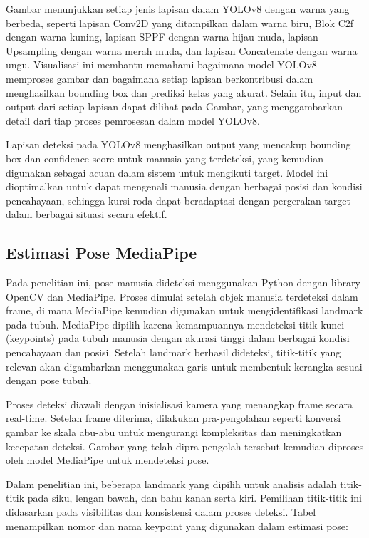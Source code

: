 Gambar menunjukkan setiap jenis lapisan dalam YOLOv8 dengan warna yang berbeda, seperti lapisan Conv2D yang ditampilkan dalam warna biru, Blok C2f dengan warna kuning, lapisan SPPF dengan warna hijau muda, lapisan Upsampling dengan warna merah muda, dan lapisan Concatenate dengan warna ungu. Visualisasi ini membantu memahami bagaimana model YOLOv8 memproses gambar dan bagaimana setiap lapisan berkontribusi dalam menghasilkan bounding box dan prediksi kelas yang akurat. Selain itu, input dan output dari setiap lapisan dapat dilihat pada Gambar, yang menggambarkan detail dari tiap proses pemrosesan dalam model YOLOv8.

Lapisan deteksi pada YOLOv8 menghasilkan output yang mencakup bounding box dan confidence score untuk manusia yang terdeteksi, yang kemudian digunakan sebagai acuan dalam sistem untuk mengikuti target. Model ini dioptimalkan untuk dapat mengenali manusia dengan berbagai posisi dan kondisi pencahayaan, sehingga kursi roda dapat beradaptasi dengan pergerakan target dalam berbagai situasi secara efektif.

\subsection{Estimasi Pose MediaPipe}
\label{subsec:estimasi_pose_mediapipe}

Pada penelitian ini, pose manusia dideteksi menggunakan Python dengan library OpenCV dan MediaPipe. Proses dimulai setelah objek manusia terdeteksi dalam frame, di mana MediaPipe kemudian digunakan untuk mengidentifikasi landmark pada tubuh. MediaPipe dipilih karena kemampuannya mendeteksi titik kunci (keypoints) pada tubuh manusia dengan akurasi tinggi dalam berbagai kondisi pencahayaan dan posisi. Setelah landmark berhasil dideteksi, titik-titik yang relevan akan digambarkan menggunakan garis untuk membentuk kerangka sesuai dengan pose tubuh.

Proses deteksi diawali dengan inisialisasi kamera yang menangkap frame secara real-time. Setelah frame diterima, dilakukan pra-pengolahan seperti konversi gambar ke skala abu-abu untuk mengurangi kompleksitas dan meningkatkan kecepatan deteksi. Gambar yang telah dipra-pengolah tersebut kemudian diproses oleh model MediaPipe untuk mendeteksi pose.

Dalam penelitian ini, beberapa landmark yang dipilih untuk analisis adalah titik-titik pada siku, lengan bawah, dan bahu kanan serta kiri. Pemilihan titik-titik ini didasarkan pada visibilitas dan konsistensi dalam proses deteksi. Tabel menampilkan nomor dan nama keypoint yang digunakan dalam estimasi pose:

